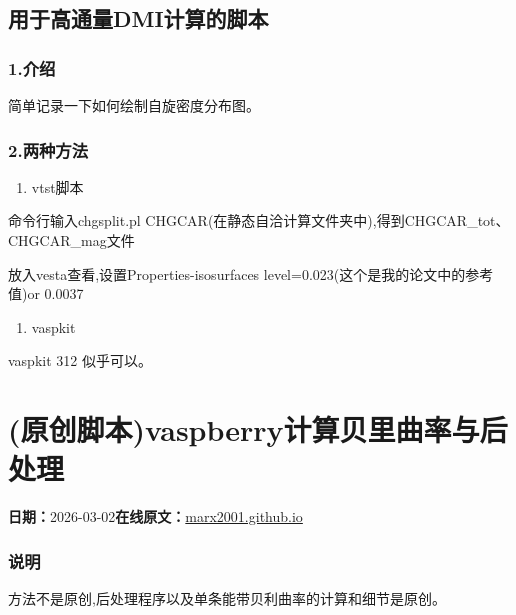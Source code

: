 \documentclass[lang=cn,scheme=chinese,color=blue,device=normal,toc=onecol,math=cm]{elegantbook}
\begin{document}
\subsection{用于高通量DMI计算的脚本}


\subsubsection{1.介绍}


简单记录一下如何绘制自旋密度分布图。\par


\subsubsection{2.两种方法}


\begin{enumerate}
\item vtst脚本
\end{enumerate}


命令行输入chgsplit.pl CHGCAR(在静态自洽计算文件夹中),得到CHGCAR\_\allowbreak{}tot、CHGCAR\_\allowbreak{}mag文件\par


放入vesta查看,设置Properties-isosurfaces level=0.023(这个是我的论文中的参考值)or 0.0037\par


\begin{enumerate}
\item vaspkit
\end{enumerate}


vaspkit 312 似乎可以。\par



\section{(原创脚本)vaspberry计算贝里曲率与后处理}
\begin{articlemeta}
\textbf{日期：}2026-03-02\hfill\textbf{在线原文：}\href{https://marx2001.github.io/sci-note\_posts/20260302-berry}{marx2001.github.io}
\end{articlemeta}

\subsubsection{说明}


方法不是原创,后处理程序以及单条能带贝利曲率的计算和细节是原创。\par
\end{document}
